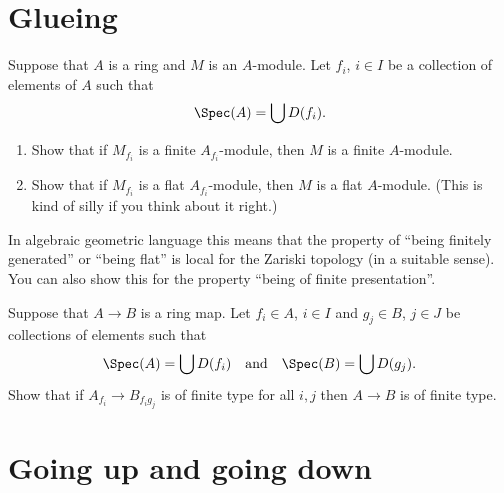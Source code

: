 \section{Glueing}
\label{section-glueing}

\begin{exercise}
\label{exercise-cover}
Suppose that $A$ is a ring and $M$ is an $A$-module.
Let $f_i$, $i \in I$ be a collection of elements of $A$ such that
$$
\Spec(A) = \bigcup D(f_i).
$$
\begin{enumerate}
\item Show that if $M_{f_i}$ is a finite $A_{f_i}$-module,
then $M$ is a finite $A$-module.
\item Show that if $M_{f_i}$ is a flat $A_{f_i}$-module,
then $M$ is a flat $A$-module.
(This is kind of silly if you think about it right.)
\end{enumerate}
\end{exercise}

\begin{remark}
\label{remark-cover}
In algebraic geometric language this means that the property
of ``being finitely generated'' or ``being flat'' is local for the Zariski
topology (in a suitable sense). You can also show this for the property
``being of finite presentation''.
\end{remark}

\begin{exercise}
\label{exercise-cover-ring-map}
Suppose that $A \to B$ is a ring map.
Let $f_i \in A$, $i \in I$ and $g_j \in B$, $j \in J$ be collections of
elements such that
$$
\Spec(A) = \bigcup D(f_i)
\quad\text{and}\quad
\Spec(B) = \bigcup D(g_j).
$$
Show that if $A_{f_i} \to B_{f_ig_j}$ is of finite type for all $i, j$
then $A \to B$ is of finite type.
\end{exercise}




\section{Going up and going down}
\label{section-going-up}


